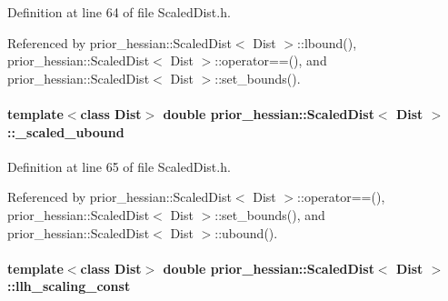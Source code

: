 Definition at line 64 of file Scaled\+Dist.\+h.



Referenced by prior\+\_\+hessian\+::\+Scaled\+Dist$<$ Dist $>$\+::lbound(), prior\+\_\+hessian\+::\+Scaled\+Dist$<$ Dist $>$\+::operator==(), and prior\+\_\+hessian\+::\+Scaled\+Dist$<$ Dist $>$\+::set\+\_\+bounds().

\paragraph[{\texorpdfstring{\+\_\+scaled\+\_\+ubound}{_scaled_ubound}}]{\setlength{\rightskip}{0pt plus 5cm}template$<$class Dist$>$ double {\bf prior\+\_\+hessian\+::\+Scaled\+Dist}$<$ Dist $>$\+::\+\_\+scaled\+\_\+ubound\hspace{0.3cm}{\ttfamily [protected]}}\hypertarget{classprior__hessian_1_1ScaledDist_a98811d53e6f78eae86ec88afc322baa2}{}\label{classprior__hessian_1_1ScaledDist_a98811d53e6f78eae86ec88afc322baa2}


Definition at line 65 of file Scaled\+Dist.\+h.



Referenced by prior\+\_\+hessian\+::\+Scaled\+Dist$<$ Dist $>$\+::operator==(), prior\+\_\+hessian\+::\+Scaled\+Dist$<$ Dist $>$\+::set\+\_\+bounds(), and prior\+\_\+hessian\+::\+Scaled\+Dist$<$ Dist $>$\+::ubound().

\paragraph[{\texorpdfstring{llh\+\_\+scaling\+\_\+const}{llh_scaling_const}}]{\setlength{\rightskip}{0pt plus 5cm}template$<$class Dist$>$ double {\bf prior\+\_\+hessian\+::\+Scaled\+Dist}$<$ Dist $>$\+::llh\+\_\+scaling\+\_\+const\hspace{0.3cm}{\ttfamily [protected]}}\hypertarget{classprior__hessian_1_1ScaledDist_a6aeaf23b5868bdb9afcbd944e05f68d3}{}\label{classprior__hessian_1_1ScaledDist_a6aeaf23b5868bdb9afcbd944e05f68d3}



